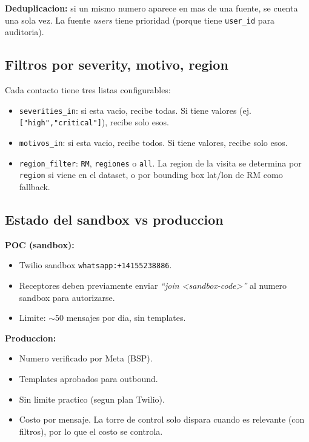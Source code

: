\documentclass[11pt,a4paper]{article}
\begin{document}
\textbf{Deduplicacion:} si un mismo numero aparece en mas de una
fuente, se cuenta una sola vez. La fuente \emph{users} tiene
prioridad (porque tiene \texttt{user\_id} para auditoria).

\subsection{Filtros por severity, motivo, region}

Cada contacto tiene tres listas configurables:

\begin{itemize}
  \item \texttt{severities\_in}: si esta vacio, recibe todas. Si tiene
        valores (ej. \texttt{["high","critical"]}), recibe solo esos.
  \item \texttt{motivos\_in}: si esta vacio, recibe todos. Si tiene
        valores, recibe solo esos.
  \item \texttt{region\_filter}: \texttt{RM}, \texttt{regiones} o
        \texttt{all}. La region de la visita se determina por
        \texttt{region} si viene en el dataset, o por bounding box
        lat/lon de RM como fallback.
\end{itemize}

\subsection{Estado del sandbox vs produccion}

\textbf{POC (sandbox):}
\begin{itemize}
  \item Twilio sandbox \texttt{whatsapp:+14155238886}.
  \item Receptores deben previamente enviar \emph{``join
        \textit{<sandbox-code>}''} al numero sandbox para autorizarse.
  \item Limite: \(\sim\)50 mensajes por dia, sin templates.
\end{itemize}

\textbf{Produccion:}
\begin{itemize}
  \item Numero verificado por Meta (BSP).
  \item Templates aprobados para outbound.
  \item Sin limite practico (segun plan Twilio).
  \item Costo por mensaje. La torre de control solo dispara cuando es
        relevante (con filtros), por lo que el costo se controla.
\end{itemize}
\end{document}
